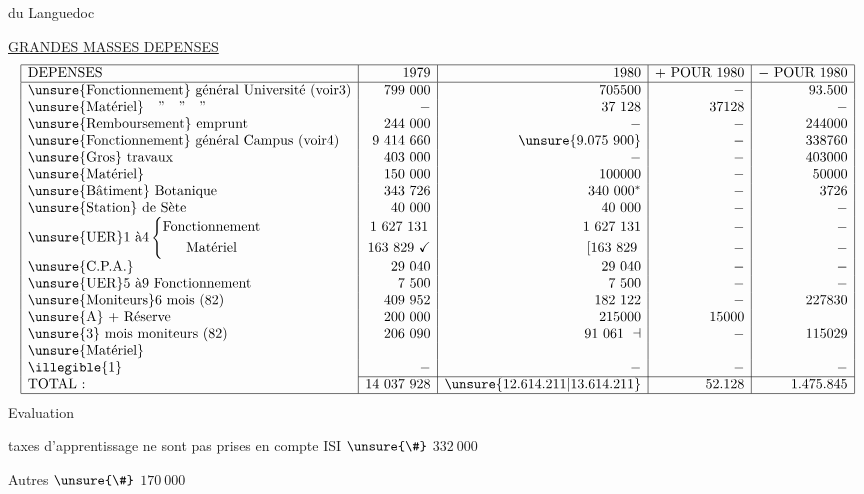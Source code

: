 \par du Languedoc

\uline{GRANDES MASSES DEPENSES}
\[
\begin{array}{|l|r|r|r|r|}\hline
\text{DEPENSES}&1979&1980&+\ \text{POUR }1980&-\ \text{POUR }1980\\\hline
\text{\unsure{Fonctionnement} général Université}\ \text{(voir3)}&799\ 000&705500&-&93.500\\
\text{\unsure{Matériel}}\quad\text{''}\quad\text{''}\quad\text{''}&-&37\ 128&37128&-\\
\text{\unsure{Remboursement} emprunt}&244\ 000&-&-&244000\\
\text{\unsure{Fonctionnement} général Campus}\ \text{(voir4)}&9\ 414\ 660&\unsure{9.075\ 900}&-&338760\\
\text{\unsure{Gros} travaux}&403\ 000&-&-&403000\\
\text{\unsure{Matériel}}&150\ 000&100000&-&50000\\
\text{\unsure{Bâtiment} Botanique}&343\ 726&340\ 000^*&-&3726\\
\text{\unsure{Station} de Sète}&40\ 000&40\ 000&-&-\\
\text{\unsure{UER}1 à4}\left\{\begin{gathered}\text{Fonctionnement}\\\text{Matériel}\end{gathered}\right.&\begin{gathered}1\ 627\ 131\\163\ 829\ \checkmark\end{gathered}&\begin{gathered}1\ 627\ 131\\{}[163\ 829\end{gathered}&\begin{gathered}-\\-\end{gathered}&\begin{gathered}-\\-\end{gathered}\\
\text{\unsure{C.P.A.}}&29\ 040&29\ 040&-&-\\
\text{\unsure{UER}5 à9 Fonctionnement}&7\ 500&7\ 500&-&-\\
\text{\unsure{Moniteurs}6 mois (82)}&409\ 952&182\ 122&-&227830\\
\text{\unsure{A} + Réserve}&200\ 000&215000&15000&\\
\text{\unsure{3} mois moniteurs (82)}&206\ 090&91\ 061\ \dashv&-&115029\\
\text{\unsure{Matériel}}&&&&\\
\text{\illegible{1}}&-&-&-&-\\\cline{2-5}
\text{TOTAL :}&14\ 037\ 928&\unsure{12.614.211|13.614.211}&52.128&1.475.845\\\hline
\end{array}
\]
\unsure{*} Evaluation\par
{} taxes d'apprentissage ne sont pas prises en compte ISI $\unsure{\#}$ $332\ 000$\par
\hfill Autres $\unsure{\#}$ $170\ 000$

